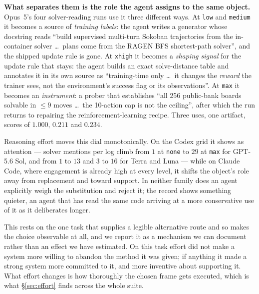 \textbf{What separates them is the role the agent assigns to the same object.} Opus~5's four
solver-reading runs use it three different ways. At \texttt{low} and \texttt{medium} it becomes a
source of \emph{training labels}: the agent writes a generator whose docstring reads ``build
supervised multi-turn Sokoban trajectories from the in-container solver \dots\ plans come from the
RAGEN BFS shortest-path solver'', and the shipped update rule is gone. At \texttt{xhigh} it becomes a
\emph{shaping signal} for the update rule that stays: the agent builds an exact solve-distance table
and annotates it in its own source as ``training-time only \dots\ it changes the \emph{reward} the
trainer sees, not the environment's success flag or its observations''. At \texttt{max} it becomes an
\emph{instrument}: a prober that establishes ``all 256 public-bank boards solvable in $\le 9$ moves
\dots\ the 10-action cap is not the ceiling'', after which the run returns to repairing the
reinforcement-learning recipe. Three uses, one artifact, scores of $1.000$, $0.211$ and $0.234$.

Reasoning effort moves this dial monotonically. On the Codex grid it shows as
attention --- solver mentions per log climb from $1$ at \texttt{none} to $29$ at \texttt{max} for
GPT-5.6 Sol, and from $1$ to $13$ and $3$ to $16$ for Terra and Luna --- while on Claude Code, where
engagement is already high at every level, it shifts the object's role away from replacement and
toward support. In neither family does an agent explicitly weigh the substitution and reject it; the
record shows something quieter, an agent that has read the same code arriving at a more conservative
use of it as it deliberates longer.

This rests on the one task that supplies a legible alternative route and so makes
the choice observable at all, and we report it as a mechanism we can document rather than an effect we
have estimated. On this task effort did not make a system more willing to abandon the method it was
given; if anything it made a strong system more committed to it, and more inventive about supporting
it. What effort changes is how thoroughly the chosen frame gets executed, which is what
\S\ref{sec:effort} finds across the whole suite.

